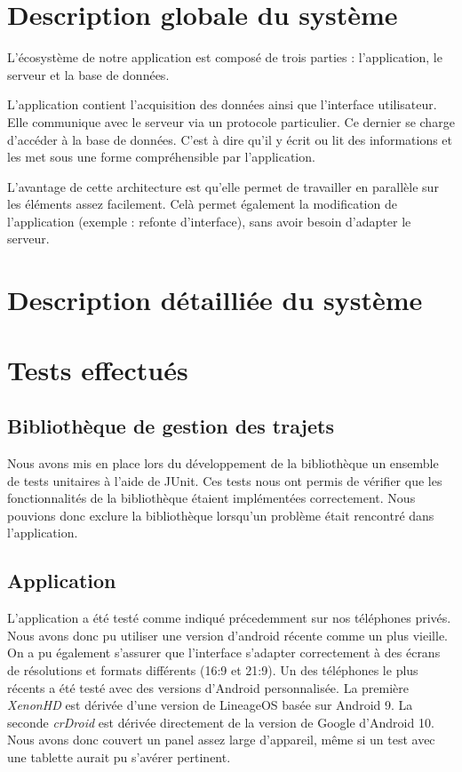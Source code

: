 \section{Description globale du système}

L'écosystème de notre application est composé de trois parties : l'application, le serveur et la base de données.
\par
L'application contient l'acquisition des données ainsi que l'interface utilisateur. Elle communique avec le serveur via un protocole particulier.
Ce dernier se charge d'accéder à la base de données. C'est à dire qu'il y écrit ou lit des informations et les met sous une forme compréhensible par l'application.
\par
L'avantage de cette architecture est qu'elle permet de travailler en parallèle sur les éléments assez facilement. Celà permet également la modification de l'application (exemple : refonte d'interface), sans avoir besoin d'adapter le serveur.
\section{Description détailliée du système}



\section{Tests effectués}
\subsection{Bibliothèque de gestion des trajets}
Nous avons mis en place lors du développement de la bibliothèque un ensemble de tests unitaires à l'aide de JUnit.
Ces tests nous ont permis de vérifier que les fonctionnalités de la bibliothèque étaient implémentées correctement.
Nous pouvions donc exclure la bibliothèque lorsqu'un problème était rencontré dans l'application.
\subsection{Application}
L'application a été testé comme indiqué précedemment sur nos téléphones privés. Nous avons donc pu utiliser une version d'android récente comme un plus vieille. On a pu également s'assurer que l'interface s'adapter correctement à des écrans de résolutions et formats différents (16:9 et 21:9).
Un des téléphones le plus récents a été testé avec des versions d'Android personnalisée. La première \emph{XenonHD} est dérivée d'une version de LineageOS basée sur Android 9. La seconde \emph{crDroid} est dérivée directement de la version de Google d'Android 10. Nous avons donc couvert un panel assez large d'appareil, même si un test avec une tablette aurait pu s'avérer pertinent.
